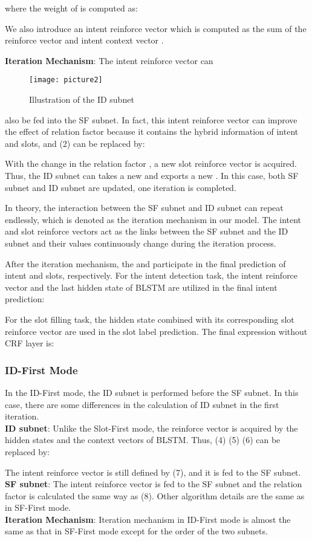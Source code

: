 \documentclass[11pt,a4paper]{article}
\begin{document}
where the weight  of  is computed as:

We also introduce an intent reinforce vector  which is computed as the sum of the reinforce vector  and intent context vector . 

\textbf{Iteration Mechanism}: The intent reinforce vector  can
\begin{figure}
 \centering
 \texttt{[image: picture2]}
 \caption{\label{fig:hist}Illustration of the ID subnet}
\end{figure}
also be fed into the SF subnet. In fact, this intent reinforce vector  can improve the effect of relation factor  because it contains the hybrid information of intent and slots, and (2) can be replaced by:

With the change in the relation factor , a new slot reinforce vector  is acquired. Thus, the ID subnet can takes a new  and exports a new . In this case, both SF subnet and ID subnet are updated, one iteration is completed.

In theory, the interaction between the SF subnet and ID subnet can repeat endlessly, which is denoted as the iteration mechanism in our model. The intent and slot reinforce vectors act as the links between the SF subnet and the ID subnet and their values continuously change during the iteration process.

After the iteration mechanism, the  and  participate in the final prediction of intent and slots, respectively. For the intent detection task, the intent reinforce vector  and the last hidden state  of BLSTM are utilized in the final intent prediction:

For the slot filling task, the hidden state  combined with its corresponding slot reinforce vector  are used in the  slot label prediction. The final expression without CRF layer is:

\subsubsection{ID-First Mode}
In the ID-First mode, the ID subnet is performed before the SF subnet. In this case, there are some differences in the calculation of ID subnet in the first iteration.\\
\textbf{ID subnet}: Unlike the Slot-First mode, the reinforce vector  is acquired by the hidden states and the context vectors of BLSTM. Thus, (4) (5) (6) can be replaced by:

The intent reinforce vector  is still defined by (7), and it is fed to the SF subnet.\\
\textbf{SF subnet}: The intent reinforce vector  is fed to the SF subnet and the relation factor  is calculated the same way as (8).
Other algorithm details are the same as in SF-First mode.\\
\textbf{Iteration Mechanism}: Iteration mechanism in ID-First mode is almost the same as that in SF-First mode except for the order of the two subnets. 
\end{document}
